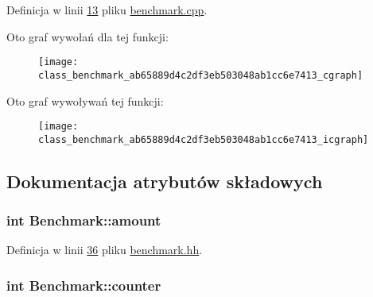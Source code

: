 Definicja w linii \hyperlink{benchmark_8cpp_source_l00013}{13} pliku \hyperlink{benchmark_8cpp_source}{benchmark.\-cpp}.



Oto graf wywołań dla tej funkcji\-:\nopagebreak
\begin{figure}[H]
\begin{center}
\leavevmode
\texttt{[image: class\_benchmark\_ab65889d4c2df3eb503048ab1cc6e7413\_cgraph]}
\end{center}
\end{figure}




Oto graf wywoływań tej funkcji\-:
\nopagebreak
\begin{figure}[H]
\begin{center}
\leavevmode
\texttt{[image: class\_benchmark\_ab65889d4c2df3eb503048ab1cc6e7413\_icgraph]}
\end{center}
\end{figure}




\subsection{Dokumentacja atrybutów składowych}
\hypertarget{class_benchmark_a1d0eaa6febe9b7a7f5f5147e83f60910}{
\subsubsection[{amount}]{\setlength{\rightskip}{0pt plus 5cm}int Benchmark\-::amount\hspace{0.3cm}{\ttfamily [private]}}}\label{class_benchmark_a1d0eaa6febe9b7a7f5f5147e83f60910}


Definicja w linii \hyperlink{benchmark_8hh_source_l00036}{36} pliku \hyperlink{benchmark_8hh_source}{benchmark.\-hh}.

\hypertarget{class_benchmark_a3a56c7dad0b21e490f3024d5d0027f31}{
\subsubsection[{counter}]{\setlength{\rightskip}{0pt plus 5cm}int Benchmark\-::counter\hspace{0.3cm}{\ttfamily [private]}}}\label{class_benchmark_a3a56c7dad0b21e490f3024d5d0027f31}


